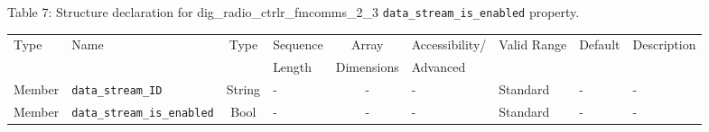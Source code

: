 \documentclass{article}
\def\comp{dig\_radio\_ctrlr\_fmcomms\_2\_3}
\begin{document}
\begin{landscape}
	\noindent Table \hypertarget{tab7}{7}: Structure declaration for \comp{} \verb+data_stream_is_enabled+ property.
	\begin{scriptsize}
		\noindent\begin{longtable}{|p{1.8cm}|p{3.6cm}|c|p{4cm}|c|p{2cm}|p{1.7cm}|p{0.8cm}|p{4.81cm}|}
			\hline
			\rowcolor{blue}
			Type         & Name                                & Type & Sequence & Array      & Accessibility/ & Valid Range  & Default & Description                                                                                                                                                                                                                       \\
			\rowcolor{blue}
			             &                                     &      & Length   & Dimensions & Advanced       &              &         &                                                                                                                                                                                                                             \\
			\hline
			Member       & \verb+data_stream_ID+               & String& -       & -          & -              & Standard     & -       & - \\
			\hline
			Member       & \verb+data_stream_is_enabled+       & Bool& -       & -          & -              & Standard & -       & - \\
			\hline
		\end{longtable}
	\end{scriptsize}


\end{landscape}
\end{document}
